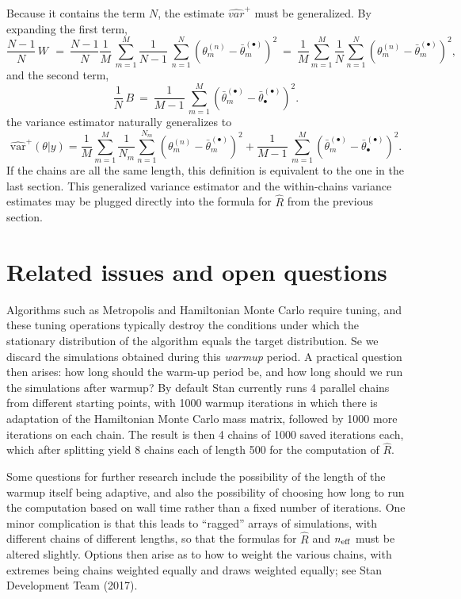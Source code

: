 \documentclass[11pt]{article}
\begin{document}
Because it contains the term $N$, the estimate $\widehat{var}^{+}$
must be generalized.  By expanding the first term,
\[
\frac{N-1}{N}\, W \,
\ = \
\frac{N-1}{N} \frac{1}{M} \, \sum_{m=1}^M
\frac{1}{N-1} \, \sum_{n=1}^N (\theta^{(n)}_m -
\bar{\theta}^{(\bullet)}_m)^2
\ = \
\frac{1}{M}
\sum_{m=1}^M
\frac{1}{N}
\sum_{n=1}^N (\theta^{(n)}_m -
\bar{\theta}^{(\bullet)}_m)^2,
\]
and the second term,
\[
\frac{1}{N}\, B
\ = \
\frac{1}{M-1} \, \sum_{m=1}^M (\bar{\theta}^{(\bullet)}_{m} - \bar{\theta}^{(\bullet)}_{\bullet})^2.
\]
the variance estimator naturally generalizes to
\[
\widehat{\mbox{var}}^{+}\!(\theta|y)
=
\frac{1}{M}
\sum_{m=1}^M
\frac{1}{N_m}
\sum_{n=1}^{N_m} (\theta^{(n)}_m -
\bar{\theta}^{(\bullet)}_m)^2
+
\frac{1}{M-1} \, \sum_{m=1}^M (\bar{\theta}^{(\bullet)}_{m} -
\bar{\theta}^{(\bullet)}_{\bullet})^2.
\]
%
If the chains are all the same length, this definition is equivalent
to the one in the last section.  This generalized variance estimator
and the within-chains variance estimates may be plugged directly into
the formula for $\hat{R}$ from the previous section.

\section{Related issues and open questions}

\label{warmup}Algorithms such as Metropolis and Hamiltonian Monte Carlo require tuning, and these tuning operations typically destroy the conditions under which the stationary distribution of the algorithm equals the target distribution.  Se we discard the simulations obtained during this {\em warmup} period.  A practical question then arises:  how long should the warm-up period be, and how long should we run the simulations after warmup?  By default Stan currently runs 4 parallel chains from different starting points, with 1000 warmup iterations in which there is adaptation of the Hamiltonian Monte Carlo mass matrix, followed by 1000 more iterations on each chain.  The result is then 4 chains of 1000 saved iterations each, which after splitting yield 8 chains each of length 500 for the computation of $\widehat{R}$.

Some questions for further research include the possibility of the length of the warmup itself being adaptive, and also the possibility of choosing how long to run the computation based on wall time rather than a fixed number of iterations.  One minor complication is that this leads to ``ragged'' arrays of simulations, with different chains of different lengths, so that the formulas for $\widehat{R}$ and $n_{\rm eff}$ must be altered slightly.  Options then arise as to how to weight the various chains, with extremes being chains weighted equally and draws weighted equally; see Stan Development Team (2017).
\end{document}
